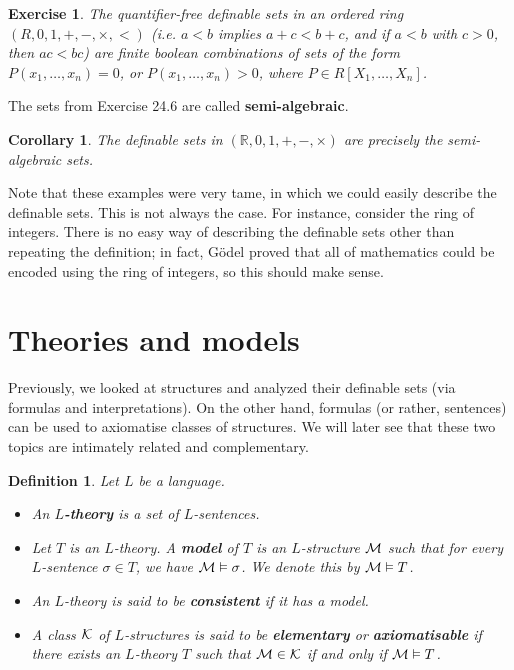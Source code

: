 \documentclass[10pt]{article}
\newcommand{\R}{\mathbb{R}}
\theoremstyle{newstyle}
\newtheorem{cor}[thm]{Corollary}
\newtheorem{defn}[thm]{Definition}
\newtheorem{exercise}[thm]{Exercise}
\begin{document}
\begin{exercise}
The quantifier-free definable sets in an ordered ring $(R, 0, 1, +, -, \times, <)$ 
(i.e. $a < b$ implies $a + c < b + c$, and if $a < b$ with $c > 0$, then $ac < bc$) 
are finite boolean combinations of sets of the form $P(x_1, \dots, x_n) = 0$, or 
$P(x_1, \dots, x_n) > 0$,
where $P \in R[X_1, \dots, X_n]$.
\end{exercise}

The sets from Exercise 24.6 are called {\bf semi-algebraic}. 

\begin{cor}
The definable sets in $(\R, 0, 1, +, -, \times)$ are precisely the semi-algebraic sets.
\end{cor}

Note that these examples were very tame, in which we could easily describe the definable sets. 
This is not always the case. For instance, consider the ring of integers. There is 
no easy way of describing the definable sets other than repeating the definition; 
in fact, G\"odel proved that all of mathematics could be encoded using the ring of 
integers, so this should make sense.

\newpage 
\section{Theories and models}

Previously, we looked at structures and analyzed their definable sets (via formulas and 
interpretations). On the other hand, formulas 
(or rather, sentences) can be used to axiomatise classes of structures. We 
will later see that these two topics are intimately related and complementary. 

\begin{defn} Let $L$ be a language.
\begin{itemize}
    \item An {\bf $L$-theory} is a set of $L$-sentences.
    \item Let $T$ is an $L$-theory. A {\bf model} of $T$ is an $L$-structure ${\cal M}$ 
    such that for every $L$-sentence $\sigma \in T$, we have ${\cal M} \vDash \sigma$. 
    We denote this by ${\cal M} \vDash T$.
    \item An $L$-theory is said to be {\bf consistent} if it has a model.
    \item A class ${\cal K}$ of $L$-structures is said to be {\bf elementary} or 
    {\bf axiomatisable} if there exists an $L$-theory $T$ such that 
    ${\cal M} \in {\cal K}$ if and only if ${\cal M} \vDash T$.
\end{itemize}
\end{defn}
\end{document}
